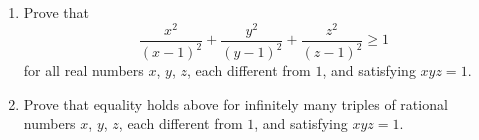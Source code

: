 \begin{enumerate}[label = (\alph*)]
	\item Prove that\[\frac {x^{2}}{\left(x - 1\right)^{2}} + \frac {y^{2}}{\left(y - 1\right)^{2}} + \frac {z^{2}}{\left(z - 1\right)^{2}} \geq 1\] for all real numbers $x$,  $y$,  $z$,  each different from $1$,  and satisfying $xyz=1$.
		
	\item Prove that equality holds above for infinitely many triples of rational numbers $x$,  $y$,  $z$,  each different from $1$,  and satisfying $xyz=1$.
\end{enumerate}
